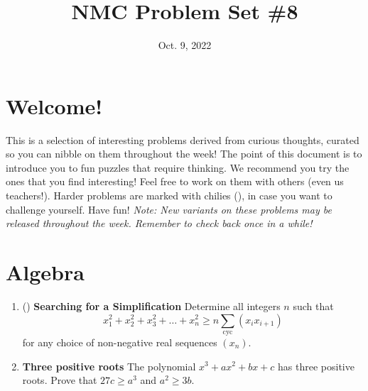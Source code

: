 \documentclass[11pt]{scrartcl}
\begin{document}
\title{NMC Problem Set \#8} %
\date{Oct. 9, 2022} %
\maketitle

\section*{Welcome!}

This is a selection of interesting problems derived from curious thoughts, curated so you can nibble on them throughout the week! The point of this document is to introduce you to fun puzzles that require thinking. We recommend you try the ones that you find interesting! Feel free to work on them with others (even us teachers!). Harder problems are marked with chilies (\fullchili), in case you want to challenge yourself.
\newline\newline
Have fun! \textit{Note: New variants on these problems may be released throughout the week. Remember to check back once in a while!}
    
\section{Algebra}
\begin{enumerate}[label=\textbf{A\arabic*}.]
    \item (\fullchili) \textbf{Searching for a Simplification} \newline
    Determine all integers $n$ such that
    \[ x_1^2 + x_2^2 + x_3^2 + \dots + x_n^2 \geq n\sum_{\mathrm{cyc}} \left( x_i x_{i+1} \right) \]
    for any choice of non-negative real sequences $(x_n)$.
    
    \item \textbf{Three positive roots} \newline
    The polynomial $x^3 + ax^2 + bx + c$ has three positive roots. Prove that $27c \geq a^3$ and $a^2 \geq 3b$.
\end{enumerate}

\newpage
\end{document}

